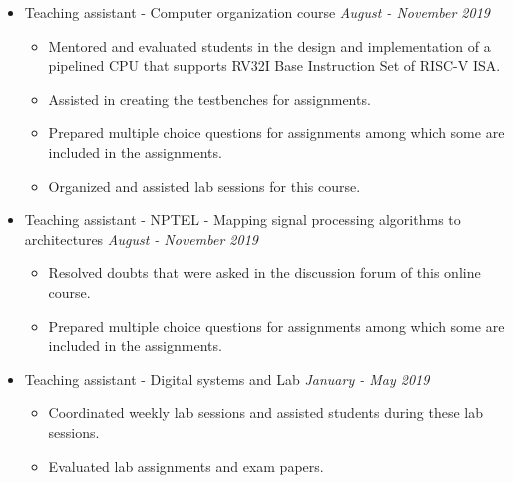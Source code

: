 \documentclass[a4paper,11pt]{article}
\newcommand{\isep}{-2 pt}
\newcommand{\spsep}{-0.75cm}
\begin{document}
\begin{itemize}
	\item Teaching assistant - Computer organization course \hfill \emph{August - November 2019} \\[\spsep]
	\begin{itemize} \itemsep \isep
		\item Mentored and evaluated students in the design and implementation of a pipelined CPU that supports RV32I Base Instruction Set of RISC-V ISA.
		\item Assisted in creating the testbenches for assignments.
		\item Prepared multiple choice questions for assignments among which some are included in the assignments.
		\item Organized and assisted lab sessions for this course.	
	\end{itemize}
	
	\item Teaching assistant - NPTEL - Mapping signal processing algorithms to architectures \hfill \emph{August - November 2019} \\[\spsep]
	\begin{itemize} \itemsep \isep
		\item Resolved doubts that were asked in the discussion forum of this online course.
		\item Prepared multiple choice questions for assignments among which some are included in the assignments.
	\end{itemize}
	
	\item Teaching assistant - Digital systems and Lab \hfill \emph{January - May 2019} \\[\spsep]
	\begin{itemize} \itemsep \isep
		\item Coordinated weekly lab sessions and assisted students during these lab sessions. 
		\item Evaluated lab assignments and exam papers.
	\end{itemize}
	
	

\fi

\end{itemize}
\end{document}
